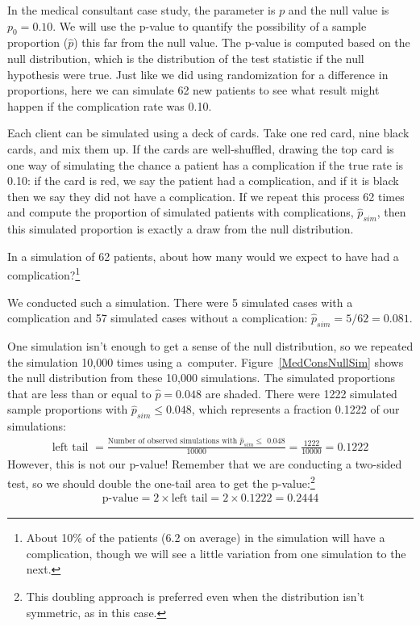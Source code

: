 In the medical consultant case study, the parameter is $p$ and the null value is $p_0 = 0.10$. We will use the p-value to quantify the possibility of a sample proportion ($\hat{p}$) this far from the null value. The p-value is computed based on the null distribution, which is the distribution of the test statistic if the null hypothesis were true. Just like we did using randomization for a difference in proportions, here we can simulate 62 new patients to see what result might happen if the complication rate was 0.10.

Each client can be simulated using a deck of cards. Take one red card, nine black cards, and mix them up. If the cards are well-shuffled, drawing the top card is one way of simulating the chance a patient has a complication if the true rate is 0.10: if the card is red, we say the patient had a complication, and if it is black then we say they did not have a complication. If we repeat this process 62 times and compute the proportion of simulated patients with complications, $\hat{p}_{sim}$, then this simulated proportion is exactly a draw from the null distribution.

\begin{exercise}
In a simulation of 62 patients, about how many would we expect to have had a complication?\footnote{About 10\% of the patients (6.2 on average) in the simulation will have a complication, though we will see a little variation from one simulation to the next.}
\end{exercise}

We conducted such a simulation. There were 5 simulated cases with a complication and 57 simulated cases without a complication: $\hat{p}_{sim} = 5/62 = 0.081$.

One simulation isn't enough to get a sense of the null distribution, so we repeated the simulation 10,000 times using a~computer. Figure~\ref{MedConsNullSim} shows the null distribution from these 10,000 simulations. The simulated proportions that are less than or equal to $\hat{p}=0.048$ are shaded. There were 1222 simulated sample proportions with $\hat{p}_{sim} \leq 0.048$, which represents a fraction 0.1222 of our simulations:
\begin{align*}
\text{left tail }
	= \frac{\text{Number of observed simulations with }\hat{p}_{sim}\leq\text{ 0.048}}{10000}
	= \frac{1222}{10000} = 0.1222
\end{align*}
However, this is not our p-value! Remember that we are conducting a two-sided test, so we should double the one-tail area to get the p-value:\footnote{This doubling approach is preferred even when the distribution isn't symmetric, as in this case.}
\begin{align*}
\text{p-value} = 2 \times \text{left tail} = 2 \times 0.1222 = 0.2444
\end{align*}


